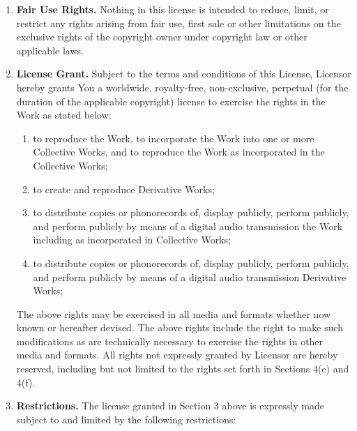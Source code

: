 \begin{enumerate}
\item \textbf{Fair Use Rights.} Nothing in this license is intended to
reduce, limit, or restrict any rights arising from fair use, first
sale or other limitations on the exclusive rights of the copyright
owner under copyright law or other applicable laws.


\item \textbf{License Grant.} Subject to the terms and conditions of
this License, Licensor hereby grants You a worldwide, royalty-free,
non-exclusive, perpetual (for the duration of the applicable
copyright) license to exercise the rights in the Work as stated below:

\begin{enumerate}
\item to reproduce the Work, to incorporate the Work into one or more
Collective Works, and to reproduce the Work as incorporated in the
Collective Works;
\item to create and reproduce Derivative Works;
\item to distribute copies or phonorecords of, display publicly,
perform publicly, and perform publicly by means of a digital audio
transmission the Work including as incorporated in Collective Works;
\item to distribute copies or phonorecords of, display publicly,
perform publicly, and perform publicly by means of a digital audio
transmission Derivative Works;
\end{enumerate}
The above rights may be exercised in all media and formats whether now
known or hereafter devised. The above rights include the right to make
such modifications as are technically necessary to exercise the rights
in other media and formats. All rights not expressly granted by
Licensor are hereby reserved, including but not limited to the rights
set forth in Sections 4(e) and 4(f).

\item \textbf{Restrictions.} The license granted in Section 3 above is
expressly made subject to and limited by the following restrictions:


\end{enumerate}
